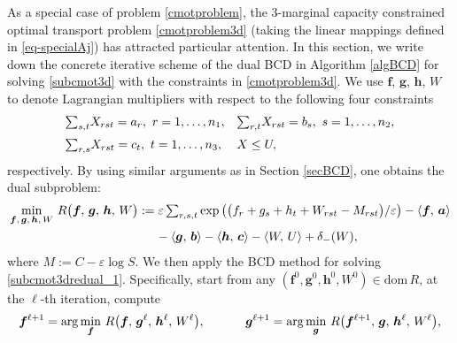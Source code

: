\documentclass[10pt]{article}
\begin{document}
\begin{appendices}
As a special case of problem \eqref{cmotproblem}, the 3-marginal capacity constrained optimal transport problem \eqref{cmotproblem3d} (taking the linear mappings defined in \eqref{eq-specialAj}) has attracted particular attention. In this section, we write down the concrete iterative scheme of the dual BCD in Algorithm \ref{algBCD} for solving \eqref{subcmot3d} with the constraints in \eqref{cmotproblem3d}. We use $\bm{f}$, $\bm{g}$, $\bm{h}$, $W$ to denote Lagrangian multipliers with respect to the following four constraints
\begin{equation*}
\begin{array}{ll}
{\textstyle\sum_{s,t}}X_{rst} = a_r, ~r = 1, \dots, n_1,
&{\textstyle\sum_{r,t}}X_{rst} = b_s, ~s = 1, \dots, n_2, \vspace{2mm} \\
{\textstyle\sum_{r,s}}X_{rst} = c_t, ~t = 1, \dots, n_3,
&X \leq U,
\end{array}
\end{equation*}
respectively. By using similar arguments as in Section \ref{secBCD}, one obtains the dual subproblem:
\begin{equation}\label{subcmot3dredual_1}
\begin{aligned}
\min\limits_{\bm{f},\,\bm{g},\,\bm{h},\,W}\,
R\big{(}\bm{f},\,\bm{g},\,\bm{h},\,W\big{)}
&:= \varepsilon\,{\textstyle\sum_{r,s,t}}\exp\big{(}\big{(}f_r + g_s + h_t + W_{rst} - M_{rst}\big{)}/\varepsilon\big{)} - \langle\bm{f}, \,\bm{a} \rangle \\
&\hspace{0.5cm} - \langle\bm{g}, \,\bm{b} \rangle - \langle\bm{h}, \,\bm{c} \rangle - \langle W, \,U \rangle + \delta_{-}(W),
\end{aligned}
\end{equation}
where $M := C - \varepsilon\log S$. We then apply the BCD method for solving \eqref{subcmot3dredual_1}. Specifically, start from any $(\bm{f}^0,\bm{g}^0,\bm{h}^0,W^0)\in\mathrm{dom}\,R$,
at the $\ell$-th iteration, compute
\begin{equation*}%
\begin{aligned}
\bm{f}^{\ell+1} &= \arg\min_{\bm{f}}\,R\big{(}\bm{f}, \,\bm{g}^\ell, \,\bm{h}^\ell, \,W^\ell\big{)},\quad \quad\quad \;
\bm{g}^{\ell+1} = \arg\min_{\bm{g}}\,R\big{(}\bm{f}^{\ell+1}, \,\bm{g}, \,\bm{h}^\ell, \,W^\ell\big{)}, \\

\end{aligned}
\end{equation*}
\end{appendices}
\end{document}
